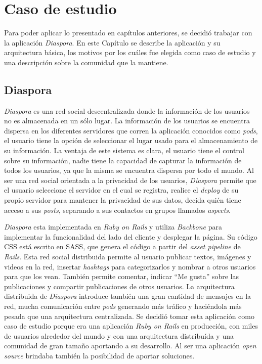\chapter{Caso de estudio}

Para poder aplicar lo presentado en capítulos anteriores, se decidió trabajar con la aplicación \emph{Diaspora}. En este Capítulo se describe la aplicación y su arquitectura básica, los motivos por los cuáles fue elegida como caso de estudio y una descripción sobre la comunidad que la mantiene.

\section{Diaspora}
\label{capitulo5:diaspora}
\emph{Diaspora} es una red social descentralizada donde la información de los  usuarios no es almacenada en un sólo lugar. La información de los usuarios se encuentra dispersa en los diferentes servidores que corren la aplicación conocidos como \emph{pods}, el usuario tiene la opción de seleccionar el lugar usado para el almacenamiento de su información.
La ventaja de este sistema es clara, el usuario tiene el control sobre su información, nadie tiene la capacidad de capturar la información de todos los usuarios, ya que la misma se encuentra dispersa por todo el mundo. Al ser una red social orientada a la privacidad de los usuarios, \emph{Diaspora} permite que el usuario seleccione el servidor en el cual se registra, realice el \emph{deploy} de su propio servidor para mantener la privacidad de sus datos, decida quién tiene acceso a sus \emph{posts}, separando a sus contactos en grupos llamados \emph{aspects}. 

\emph{Diaspora} esta implementada en \emph{Ruby on Rails} y utiliza \emph{Backbone} \cite{backbone} para implementar la funcionalidad del lado del cliente y desplegar la página. Su código CSS está escrito en SASS, que genera el código a partir del \emph{asset pipeline} de \emph{Rails}.
Esta red social distribuida permite al usuario publicar textos, imágenes y videos en la red, insertar \emph{hashtags} para categorizarlos y nombrar a otros usuarios para que los vean. También permite comentar, indicar ``Me gusta'' sobre las publicaciones y compartir publicaciones de otros usuarios.
La arquitectura distribuida de \emph{Diaspora} introduce también una gran cantidad de mensajes en la red, mucha comunicación entre \emph{pods} generando más tráfico y haciéndola más pesada que una arquitectura centralizada.
Se decidió tomar esta aplicación como caso de estudio porque era una aplicación \emph{Ruby on Rails} en producción, con miles de usuarios alrededor del mundo y con una arquitectura distribuída y una comunidad de gran tamaño aportando a su desarrollo. Al ser una aplicación \emph{open source} brindaba también la posibilidad de aportar soluciones.


